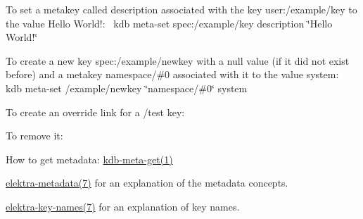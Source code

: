 To set a metakey called {\ttfamily description} associated with the key {\ttfamily user\+:/example/key} to the value {\ttfamily Hello World!}\+:~\newline
 {\ttfamily kdb meta-\/set spec\+:/example/key description \char`\"{}\+Hello World!\char`\"{}}

To create a new key {\ttfamily spec\+:/example/newkey} with a null value (if it did not exist before) and a metakey {\ttfamily namespace/\#0} associated with it to the value {\ttfamily system}\+:~\newline
 {\ttfamily kdb meta-\/set /example/newkey \char`\"{}namespace/\#0\char`\"{} system}

To create an override link for a {\ttfamily /test} key\+:




To remove it\+:





\begin{DoxyItemize}
\item How to get metadata\+: \hyperlink{doc_help_kdb-meta-get_md}{kdb-\/meta-\/get(1)}
\item \hyperlink{doc_help_elektra-metadata_md}{elektra-\/metadata(7)} for an explanation of the metadata concepts.
\item \hyperlink{doc_help_elektra-key-names_md}{elektra-\/key-\/names(7)} for an explanation of key names. 
\end{DoxyItemize}
